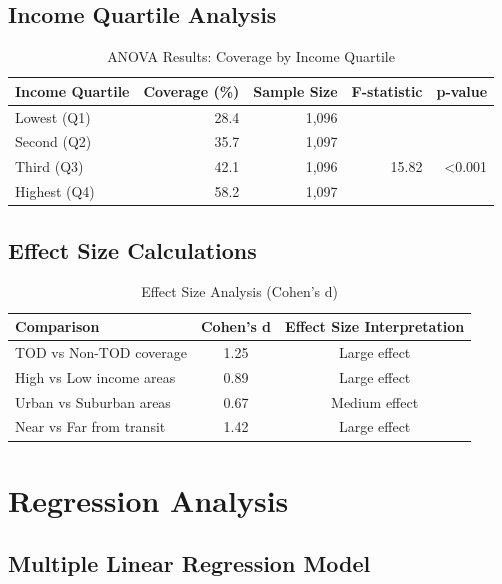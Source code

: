 \documentclass[11pt,letterpaper]{article}
\begin{document}
\subsection{Income Quartile Analysis}

\begin{table}[h]
\centering
\caption{ANOVA Results: Coverage by Income Quartile}
\begin{tabular}{lrrrr}
\toprule
\textbf{Income Quartile} & \textbf{Coverage (\%)} & \textbf{Sample Size} & \textbf{F-statistic} & \textbf{p-value} \\
\midrule
Lowest (Q1) & 28.4 & 1,096 & & \\
Second (Q2) & 35.7 & 1,097 & & \\
Third (Q3) & 42.1 & 1,096 & 15.82 & <0.001 \\
Highest (Q4) & 58.2 & 1,097 & & \\
\bottomrule
\end{tabular}
\end{table}

\subsection{Effect Size Calculations}

\begin{table}[h]
\centering
\caption{Effect Size Analysis (Cohen's d)}
\begin{tabular}{lcc}
\toprule
\textbf{Comparison} & \textbf{Cohen's d} & \textbf{Effect Size Interpretation} \\
\midrule
TOD vs Non-TOD coverage & 1.25 & Large effect \\
High vs Low income areas & 0.89 & Large effect \\
Urban vs Suburban areas & 0.67 & Medium effect \\
Near vs Far from transit & 1.42 & Large effect \\
\bottomrule
\end{tabular}
\end{table}

\section{Regression Analysis}

\subsection{Multiple Linear Regression Model}
\end{document}
